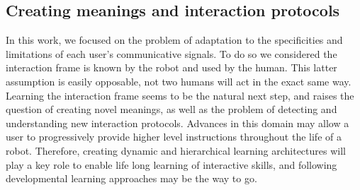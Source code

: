 




\subsection{Creating meanings and interaction protocols}



In this work, we focused on the problem of adaptation to the specificities and limitations of each user's communicative signals. To do so we considered the interaction frame is known by the robot and used by the human. This latter assumption is easily opposable, not two humans will act in the exact same way. Learning the interaction frame seems to be the natural next step, and raises the question of creating novel meanings, as well as the problem of detecting and understanding new interaction protocols. Advances in this domain may allow a user to progressively provide higher level instructions throughout the life of a robot. Therefore, creating dynamic and hierarchical learning architectures will play a key role to enable life long learning of interactive skills, and following developmental learning approaches may be the way to go.





